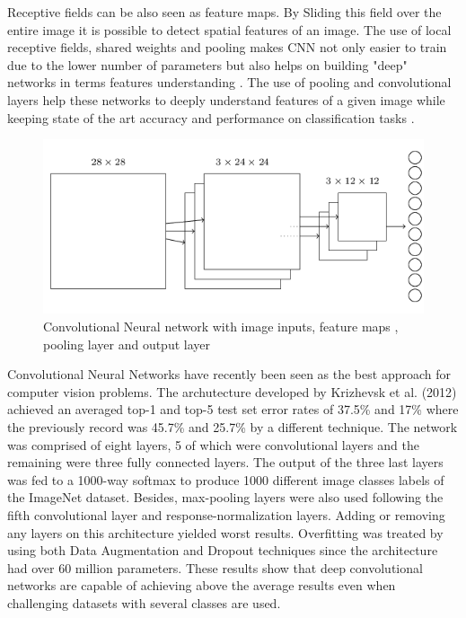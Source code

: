 \documentclass{article}
\begin{document}
Receptive fields can be also seen as feature maps. By Sliding this field over the entire image it is possible to detect spatial features of an image.  The use of local receptive fields, shared weights and pooling makes CNN not only easier to train due to the lower number of parameters but also helps on building "deep" networks in terms features understanding \cite{zeiler2014visualizing}. The use of pooling and convolutional layers help these networks to deeply understand features of a given image while keeping state of the art accuracy and performance on classification tasks \cite{krizhevsky2012}.

\begin{figure}[!h]
\centering
	\includegraphics[scale=0.6]{conv.png}
\caption{Convolutional Neural network with image inputs, feature maps , pooling layer and output layer \cite{nielsen2016}}
\label{fig:conv}
\end{figure}

Convolutional Neural Networks have recently been seen as the best approach for computer vision problems. The archutecture developed by Krizhevsk et al. (2012) achieved an averaged top-1 and top-5 test set error rates of 37.5\% and 17\% where the previously record was 45.7\% and 25.7\% by a different technique. The network was comprised of eight layers, 5 of which were convolutional layers and the remaining were three fully connected layers. The output of the three last layers was fed to a 1000-way softmax to produce 1000 different image classes labels of the ImageNet dataset. Besides, max-pooling layers were also used following the fifth convolutional layer and response-normalization layers. Adding or removing any layers on this architecture yielded worst results. Overfitting was treated by using both Data Augmentation and Dropout \cite{hinton2012improving} techniques since the architecture had over 60 million parameters. These results show that deep convolutional networks are capable of achieving above the average results even when challenging datasets with several classes are used.
\end{document}
